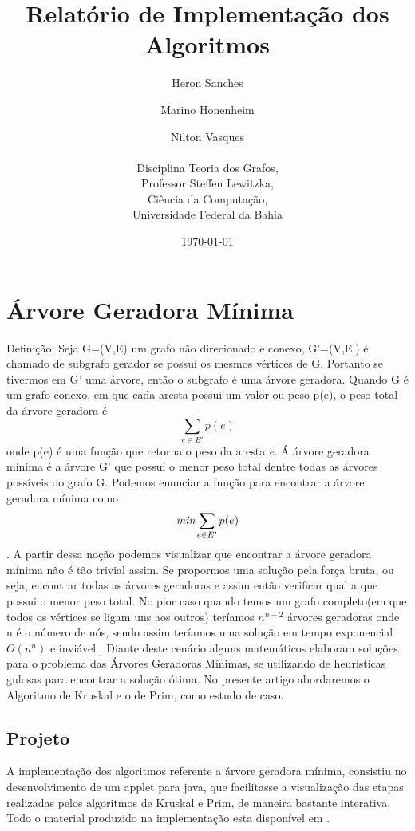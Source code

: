 \documentclass[a4paper,12pt]{article}
\begin{document}
\title{Relatório de Implementação dos Algoritmos}
\author{Heron Sanches \and Marino Honenheim \and Nilton Vasques\\\\
	Disciplina Teoria dos Grafos,\\
	Professor Steffen Lewitzka,\\
	Ciência da Computação,\\
	Universidade Federal da Bahia}
\date{\today}
\maketitle


\section{Árvore Geradora Mínima}
Definição: Seja G=(V,E) um grafo não direcionado e conexo, G'=(V,E') é chamado de subgrafo gerador se possuí os mesmos vértices de G. Portanto se tivermos em G' uma árvore, então o subgrafo é uma árvore geradora. 
Quando G é um grafo conexo, em que cada aresta possui um valor ou peso p(e), o peso total da árvore geradora é \[\sum_{e \in E'}p(e)\] onde p(e) é uma função que retorna o peso da aresta \emph{e}. Á árvore geradora mínima é a árvore G' que possui o menor peso total dentre todas as árvores possíveis do grafo G\cite{nogueira}. Podemos enunciar a função para encontrar a árvore geradora mínima como \[\emph{min}\sum_{e\in E'}p(e)\].
A partir dessa noção podemos visualizar que encontrar a árvore geradora mínima não é tão trivial assim. Se propormos uma solução pela força bruta, ou seja, encontrar todas as árvores geradoras e assim então verificar qual a que possui o menor peso total. No pior caso quando temos um grafo completo(em que todos os vértices se ligam uns aos outros) teríamos $n^{n-2}$ árvores geradoras onde n é o número de nós, sendo assim teríamos uma solução em tempo exponencial $O(n^n)$ e inviável \cite{unicamp}.
Diante deste cenário alguns matemáticos elaboram soluções para o problema das Árvores Geradoras Mínimas, se utilizando de heurísticas gulosas para encontrar a solução ótima. No presente artigo abordaremos o Algoritmo de Kruskal e o de Prim, como estudo de caso.

\subsection{Projeto}
A implementação dos algoritmos referente a árvore geradora mínima, consistiu no desenvolvimento de um applet para java, que facilitasse a visualização das etapas realizadas pelos algoritmos de Kruskal e Prim, de maneira bastante interativa. Todo o material produzido na implementação esta disponível em \cite{niltonvasques}.
\end{document}
